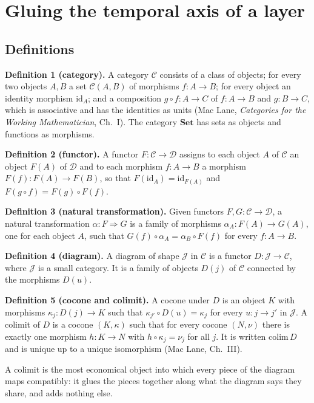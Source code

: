 \documentclass[11pt]{article}
\begin{document}
\section{Gluing the temporal axis of a layer}

\subsection{Definitions}

\textbf{Definition 1 (category).} A category $\mathcal{C}$ consists of a class of objects; for every two objects $A,B$ a set $\mathcal{C}(A,B)$ of morphisms $f:A\to B$; for every object an identity morphism $\mathrm{id}_A$; and a composition $g\circ f:A\to C$ of $f:A\to B$ and $g:B\to C$, which is associative and has the identities as units (Mac Lane, \emph{Categories for the Working Mathematician}, Ch.~I). The category $\mathbf{Set}$ has sets as objects and functions as morphisms.

\textbf{Definition 2 (functor).} A functor $F:\mathcal{C}\to\mathcal{D}$ assigns to each object $A$ of $\mathcal{C}$ an object $F(A)$ of $\mathcal{D}$ and to each morphism $f:A\to B$ a morphism $F(f):F(A)\to F(B)$, so that $F(\mathrm{id}_A)=\mathrm{id}_{F(A)}$ and $F(g\circ f)=F(g)\circ F(f)$.

\textbf{Definition 3 (natural transformation).} Given functors $F,G:\mathcal{C}\to\mathcal{D}$, a natural transformation $\alpha:F\Rightarrow G$ is a family of morphisms $\alpha_A:F(A)\to G(A)$, one for each object $A$, such that $G(f)\circ\alpha_A=\alpha_B\circ F(f)$ for every $f:A\to B$.

\textbf{Definition 4 (diagram).} A diagram of shape $\mathcal{J}$ in $\mathcal{C}$ is a functor $D:\mathcal{J}\to\mathcal{C}$, where $\mathcal{J}$ is a small category. It is a family of objects $D(j)$ of $\mathcal{C}$ connected by the morphisms $D(u)$.

\textbf{Definition 5 (cocone and colimit).} A cocone under $D$ is an object $K$ with morphisms $\kappa_j:D(j)\to K$ such that $\kappa_{j'}\circ D(u)=\kappa_j$ for every $u:j\to j'$ in $\mathcal{J}$. A colimit of $D$ is a cocone $(K,\kappa)$ such that for every cocone $(N,\nu)$ there is exactly one morphism $h:K\to N$ with $h\circ\kappa_j=\nu_j$ for all $j$. It is written $\mathrm{colim}\,D$ and is unique up to a unique isomorphism (Mac Lane, Ch.~III).

A colimit is the most economical object into which every piece of the diagram maps compatibly: it glues the pieces together along what the diagram says they share, and adds nothing else.
\end{document}

